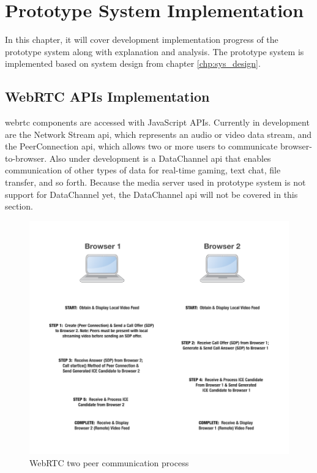 \chapter{Prototype System Implementation}
\label{chp:sys_imp}

\noindent In this chapter, it will cover development implementation progress of the prototype system along with explanation and analysis. The prototype system is implemented based on system design from chapter \ref{chp:sys_design}.

\section{WebRTC APIs Implementation}

\noindent \gls{webrtc} components are accessed with JavaScript APIs. Currently in development are the Network Stream \gls{api}, which represents an audio or video data stream, and the PeerConnection \gls{api}, which allows two or more users to communicate browser-to-browser. Also under development is a DataChannel \gls{api} that enables communication of other types of data for real-time gaming, text chat, file transfer, and so forth. Because the media server used in prototype system is not support for DataChannel yet, the DataChannel \gls{api} will not be covered in this section.

\begin{figure}
	\centering
    	\includegraphics[height=0.50\textheight,natwidth=610,natheight=642]{figs/webrtc_diagram.png}
  	\caption{WebRTC two peer communication process\cite{mdn:p2pwebrtc}}
  	\label{fig:webrtc_diagram}
\end{figure}

